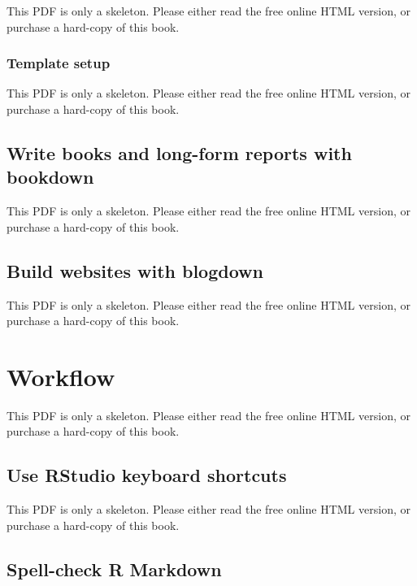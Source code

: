 \documentclass[
  11pt,
]{krantz}
\begin{document}
This PDF is only a skeleton. Please either read the free online HTML version, or purchase a hard-copy of this book.

\subsection{Template setup}\label{template-setup}

This PDF is only a skeleton. Please either read the free online HTML version, or purchase a hard-copy of this book.

\section{\texorpdfstring{Write books and long-form reports with \textbf{bookdown}}{Write books and long-form reports with bookdown}}\label{bookdown}

This PDF is only a skeleton. Please either read the free online HTML version, or purchase a hard-copy of this book.

\section{\texorpdfstring{Build websites with \textbf{blogdown}}{Build websites with blogdown}}\label{blogdown}

This PDF is only a skeleton. Please either read the free online HTML version, or purchase a hard-copy of this book.

\chapter{Workflow}\label{workflow}

This PDF is only a skeleton. Please either read the free online HTML version, or purchase a hard-copy of this book.

\section{Use RStudio keyboard shortcuts}\label{rstudio-shortcuts}

This PDF is only a skeleton. Please either read the free online HTML version, or purchase a hard-copy of this book.

\begin{table}\caption{\label{tab:shortcuts}RStudio keyboard shortcuts related to R Markdown.}\end{table}

\section{Spell-check R Markdown}\label{spell-check}
\end{document}

